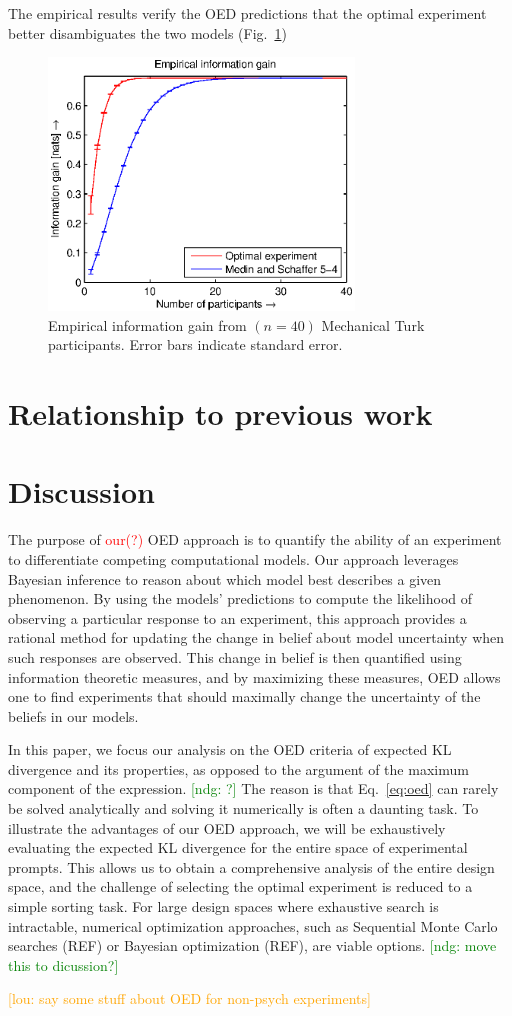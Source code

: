 \documentclass{article}
\newcommand{\red}[1]{\textcolor{Red}{#1}}
\newcommand{\ndg}[1]{\textcolor{Green}{[ndg: #1]}}
\newcommand{\lou}[1]{\textcolor{orange}{[lou: #1]}}
\begin{document}
The empirical results verify the OED predictions that the optimal experiment better disambiguates the two models (Fig.~\ref{fig:empirical})
\begin{figure}[h!]
\centering
\includegraphics[width=3.2in]{img/empirical.eps}
\caption{Empirical information gain from $(n=40)$ Mechanical Turk participants. Error bars indicate standard error.}
\label{fig:empirical}
\end{figure}


\section{Relationship to previous work}
\section{Discussion}

The purpose of \red{our(?)} OED approach is to quantify the ability of an experiment to differentiate competing computational models. Our approach leverages Bayesian inference to reason about which model best describes a given phenomenon. By using the models' predictions to compute the likelihood of observing a particular response to an experiment, this approach provides a rational method for updating the change in belief about model uncertainty when such responses are observed. This change in belief is then quantified using information theoretic measures, and by maximizing these measures, OED allows one to find experiments that should maximally change the uncertainty of the beliefs in our models.


In this paper, we focus our analysis on the OED criteria of expected KL divergence and its properties, as opposed to the argument of the maximum component of the expression. \ndg{?} The reason is that Eq.~\ref{eq:oed} can rarely be solved analytically and solving it numerically is often a daunting task. To illustrate the advantages of our OED approach, we will be exhaustively evaluating the expected KL divergence for the entire  space of experimental prompts. This allows us to obtain a comprehensive analysis of the entire design space, and the challenge of selecting the optimal experiment is reduced to a simple sorting task. For large design spaces where exhaustive search is intractable, numerical optimization approaches, such as Sequential Monte Carlo searches (REF) or Bayesian optimization (REF), are viable options.  \ndg{move this to dicussion?}



\lou{say some stuff about OED for non-psych experiments}



\end{document}
